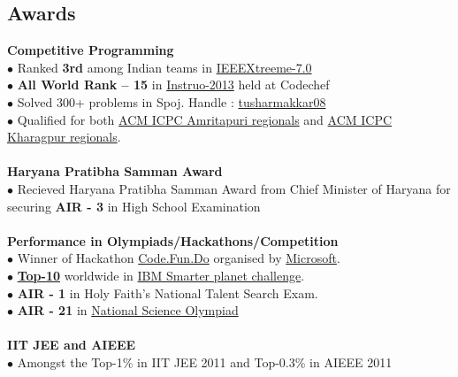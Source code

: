 \documentclass[margin,line]{resume}
\begin{document}
\begin{resume}
  \section{\mysidestyle \bf Awards}
  {\bf Competitive Programming } 
 \\$\bullet$ Ranked {\bfseries 3rd} among Indian teams in \href{http://www.ieee.org/membership_services/membership/students/competitions/xtreme/index.html}{IEEEXtreeme-7.0}
    \\$\bullet$ {\bfseries All World Rank – 15} in \href{http://www.codechef.com/rankings/INST2013/}{Instruo-2013} held at Codechef 
\\$\bullet$ Solved 300+ problems in Spoj. Handle :  \href{http://www.spoj.com/users/tusharmakkar08/}{tusharmakkar08}
    \\$\bullet$ Qualified for both \href{icpc.amrita.ac.in}{ACM ICPC Amritapuri regionals} and \href{http://acm.iitkgp.ac.in/}{ACM ICPC Kharagpur regionals}.
\\\\    {\bf Haryana Pratibha Samman Award}
     \\$\bullet$ Recieved Haryana Pratibha Samman Award from Chief Minister of Haryana for securing {\bfseries AIR - 3} in High School Examination
\\\\ {\bf Performance in Olympiads/Hackathons/Competition }
     \\$\bullet$ Winner of Hackathon \href{https://www.acadaccelerator.com/Home/Events}{Code.Fun.Do} organised by \href{http://www.microsoft.com/en-in/msidc/default.aspx}{Microsoft}.
    \\$\bullet$ \href{https://timesofindia.indiatimes.com/city/mangaluru/Mangalore-students-take-eco-literacy-online/articleshow/24455031.cms}{\bfseries{Top-10}} worldwide in \href{http://www.ibm.com/ibm/history/ibm100/us/en/icons/smarterplanet/}{IBM Smarter planet challenge}.
\\$\bullet$ {\bfseries AIR - 1} in Holy Faith's National Talent Search Exam.
    \\$\bullet$ {\bfseries AIR - 21} in \href{http://www.sofworld.org/nso}{National Science Olympiad}
    \\ \\  {\bf IIT JEE and AIEEE  } 
     \\$\bullet$ Amongst the  Top-1\% in IIT JEE 2011 and Top-0.3\% in AIEEE 2011




         

\end{resume}
\end{document}
